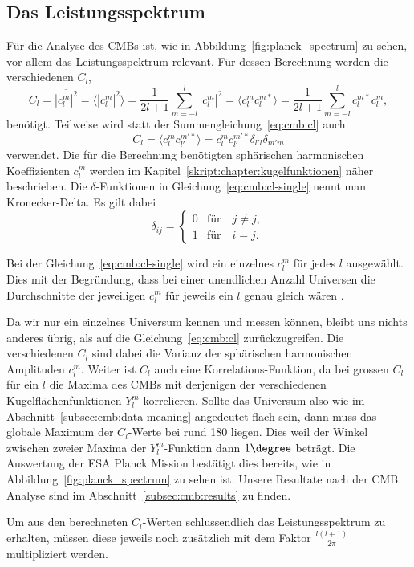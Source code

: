 \subsection{Das Leistungsspektrum\label{subsec:cmb:cl}}

Für die Analyse des CMBs ist, wie in Abbildung~\ref{fig:planck_spectrum} zu 
sehen, vor allem das Leistungsspektrum relevant. Für dessen Berechnung werden 
die verschiedenen $C_l$,
\begin{equation}
	C_l = \overline{|c_l^m|^2} = \langle |c_l^m|^2 \rangle =  \frac{1}{2l + 
	1}\sum_{m=-l}^{l}|c_l^m|^2 = \langle c_l^m 
	c_l^{m*} \rangle = 
	\frac{1}{2l + 
	1}\sum_{m=-l}^{l}c_l^{m*}c_l^m,
	\label{eq:cmb:cl}
\end{equation}
benötigt. Teilweise wird statt der Summengleichung~\eqref{eq:cmb:cl} auch
\begin{equation}
	C_l = \langle c_{l}^{m}c_{l'}^{m'*} \rangle = 
	c_{l}^{m}c_{l'}^{m'*}\delta_{l'l}\delta_{m'm}
	\label{eq:cmb:cl-single}
\end{equation}
verwendet. Die für die Berechnung benötigten sphärischen harmonischen 
Koeffizienten $c_l^m$ werden im Kapitel~\ref{skript:chapter:kugelfunktionen} 
näher beschrieben. Die $\delta$-Funktionen in 
Gleichung~\eqref{eq:cmb:cl-single} nennt man Kronecker-Delta. Es gilt dabei
\begin{equation*}
\delta_{ij} =
\begin{cases}
0 & \text{für} \quad j \neq j, \\
1 & \text{für} \quad i = j.
\end{cases}
\end{equation*}

Bei der Gleichung~\eqref{eq:cmb:cl-single} wird ein einzelnes 
$c_l^m$ für jedes $l$ ausgewählt. Dies mit der Begründung, dass bei einer 
unendlichen Anzahl Universen die Durchschnitte der jeweiligen $c_l^m$ für 
jeweils ein $l$ genau gleich wären \cite{cmb:klauber}.

Da wir nur ein einzelnes Universum kennen und messen können, bleibt uns 
nichts anderes übrig, als auf die Gleichung~\eqref{eq:cmb:cl} zurückzugreifen. 
Die verschiedenen $C_l$ sind dabei die Varianz der sphärischen harmonischen 
%
%
Amplituden $c_l^m$. Weiter ist $C_l$ auch eine Korrelations-Funktion, da bei 
grossen $C_l$ für ein $l$ die Maxima des CMBs mit derjenigen der verschiedenen 
Kugelflächenfunktionen $Y_l^m$ korrelieren. Sollte das Universum also wie im 
Abschnitt~\ref{subsec:cmb:data-meaning} angedeutet flach sein, dann muss das 
globale Maximum der $C_l$-Werte bei rund 180 liegen. Dies weil der Winkel 
zwischen zweier Maxima der $Y_l^m$-Funktion dann $1\degree$ beträgt. Die 
Auswertung der ESA Planck Mission bestätigt dies bereits, wie in 
Abbildung~\ref{fig:planck_spectrum} zu sehen ist. Unsere Resultate nach der CMB 
Analyse sind im Abschnitt~\ref{subsec:cmb:results} zu finden.

Um aus den berechneten $C_l$-Werten schlussendlich das Leistungsspektrum zu 
erhalten, müssen diese jeweils noch zusätzlich mit dem Faktor 
$\frac{l(l+1)}{2\pi}$ multipliziert werden.
